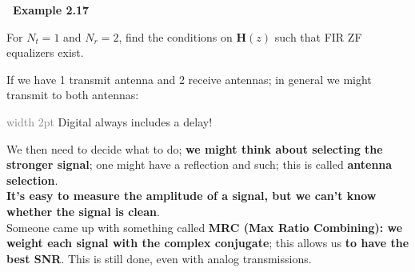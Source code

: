 \documentclass[a4paper, 12pt]{book}
\begin{document}
\begin{tcolorbox}[colback=white, colframe=obsidianBorderPurple, boxrule=1pt, rounded corners]
    \textcolor{obsidianTextPurple}{\textbf{\faList\ Example 2.17}}
    
    {\footnotesize For $N_t=1$ and $N_r=2$, find the conditions on $\mathbf{H}(z)$ such that FIR ZF equalizers exist.}
    \vspace{0.5em}

    If we have 1 transmit antenna and 2 receive antennas; in general we might transmit to both antennas:

    \begin{center}
    \end{center}

    \begin{tcolorbox}[colback=obsidianGreen, colframe=white, boxrule=0pt, sharp corners]
        \textcolor{gray}{\vrule width 2pt} \hspace{0.5em} Digital always includes a delay!
    \end{tcolorbox}

    We then need to decide what to do; \textbf{we might think about selecting the stronger signal}; one might have a reflection and such; this is called \textbf{antenna selection}.\\
    \textbf{It's easy to measure the amplitude of a signal, but we can't know whether the signal is clean}.\\
    Someone came up with something called \textbf{MRC (Max Ratio Combining): we weight each signal with the complex conjugate}; this allows us \textbf{to have the best SNR}. This is still done, even with analog transmissions.


\end{tcolorbox}
\end{document}
